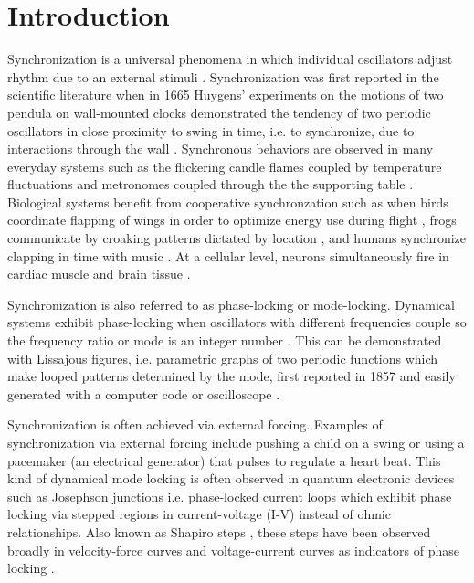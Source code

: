 \documentclass[twocolumn,preprintnumbers,amsmath,amssymb,aps,prx]{revtex4}
\begin{document}
\maketitle %

\section{Introduction} %
%
Synchronization is a universal phenomena
in which individual oscillators adjust rhythm due
to an external stimuli \cite{Pikovsky2003}.
Synchronization was first reported in the scientific literature
when in 1665 
Huygens' experiments on
the 
motions of two pendula on wall-mounted clocks 
demonstrated the tendency of 
two periodic oscillators in close
proximity to swing in time, i.e. to synchronize,
due to interactions through the wall \cite{Bennett2002}.
Synchronous behaviors are observed
in many everyday systems
such as the
flickering candle flames coupled by temperature fluctuations \cite{Okamoto2016} 
and metronomes coupled through the the supporting table \cite{Jia2015}.
Biological systems benefit from cooperative
synchronzation such as when 
birds coordinate
flapping of wings in order to optimize energy use during flight \cite{Portugal2014},
frogs communicate by croaking patterns dictated by location \cite{Aihara2014},
and humans synchronize clapping in time with music \cite{Tranchant2016}.
At a cellular level, 
neurons simultaneously fire in cardiac muscle \cite{MartinHall1999}
and brain tissue \cite{Singer1999}.

Synchronization is also referred to as 
phase-locking or mode-locking.
Dynamical systems %
exhibit phase-locking 
when oscillators with different frequencies couple
so the frequency ratio or mode 
is an integer number \cite{Bak1986} .
This can be demonstrated
with Lissajous figures, i.e. parametric graphs of two periodic functions
which make looped patterns determined by the mode, %
first reported in 1857 \cite{Lissajous1857}
and easily generated with a computer code 
or oscilloscope \cite{Tong1997}. 

Synchronization is often achieved via external forcing.
Examples of synchronization via external forcing include
pushing a child on a swing or
using a pacemaker (an electrical generator)
that pulses to regulate a heart beat.
This kind of 
dynamical mode locking
is often observed in quantum electronic
devices such as Josephson junctions \cite{Josephson1962,Josephson1965}
i.e. phase-locked current loops \cite{} 
which exhibit phase locking via
stepped regions in current-voltage (I-V) 
instead of ohmic relationships.
Also known as Shapiro steps \cite{Shapiro1963},
these steps have been observed broadly in 
velocity-force curves and voltage-current curves
as indicators of phase locking \cite{Golubov2004}.
\end{document}
